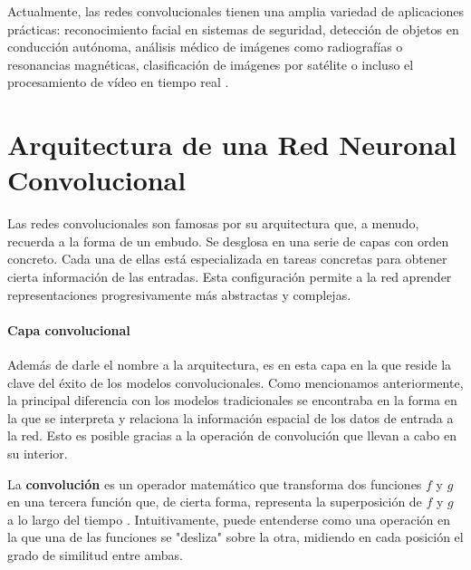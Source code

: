 Actualmente, las redes convolucionales tienen una amplia variedad de aplicaciones prácticas: reconocimiento facial en sistemas de seguridad, detección de objetos en conducción autónoma, análisis médico de imágenes como radiografías o resonancias magnéticas, clasificación de imágenes por satélite o incluso el procesamiento de vídeo en tiempo real \cite{nn_fundamentals__thakur_2021, rna_fundamentos__hilera_2021, conv_nn_face_recog__chowanda_2019}.



\section{Arquitectura de una Red Neuronal Convolucional}\label{sec:arquitectura_cnn}

Las redes convolucionales son famosas por su arquitectura que, a menudo, recuerda a la forma de un embudo. Se desglosa en una serie de capas con orden concreto. Cada una de ellas está especializada en tareas concretas para obtener cierta información de las entradas. Esta configuración permite a la red aprender representaciones progresivamente más abstractas y complejas.


\paragraph{Capa convolucional}

Además de darle el nombre a la arquitectura, es en esta capa en la que reside la clave del éxito de los modelos convolucionales. Como mencionamos anteriormente, la principal diferencia con los modelos tradicionales se encontraba en la forma en la que se interpreta y relaciona la información espacial de los datos de entrada a la red. Esto es posible gracias a la operación de convolución que llevan a cabo en su interior.

La \textbf{convolución} es un operador matemático que transforma dos funciones $f$ y $g$ en una tercera función que, de cierta forma, representa la superposición de $f$ y $g$ a lo largo del tiempo \cite{dl__goodfellow_2016}. Intuitivamente, puede entenderse como una operación en la que una de las funciones se "desliza" sobre la otra, midiendo en cada posición el grado de similitud entre ambas.

